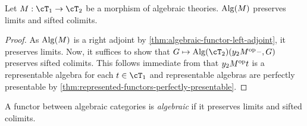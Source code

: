 \documentclass{zett}
\begin{document}
\begin{cor}
  Let $M : \cT_{1} \to \cT_{2}$ be a morphism of algebraic theories.
  $\operatorname{Alg}(M)$ preserves limits and sifted colimits.
\end{cor}
\begin{proof}
  As $\operatorname{Alg}(M)$ is a right adjoint by \cref{thm:algebraic-functor-left-adjoint}, it preserves limits.
  Now, it suffices to show that $G \mapsto \Alg(\cT_{2})(y_{2}M\op\blank, G)$ preserves sifted colimits.
  This follows immediate from that $y_{2}M^{\mathrm{op}} t$ is a representable algebra for each $t \in \cT_{1}$ and representable algebras are perfectly presentable by \cref{thm:represented-functors-perfectly-presentable}.
\end{proof}

\begin{defn}
  A functor between algebraic categories is \emph{algebraic} if it preserves limits and sifted colimits.
\end{defn}



\end{document}
